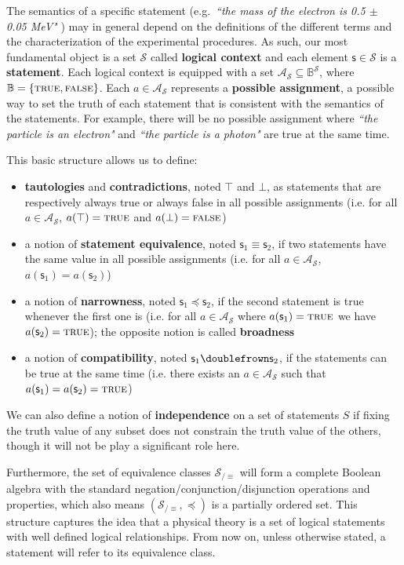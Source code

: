 \documentclass{article}
\def\Bool{\mathbb{B}}
\def\TRUE{\textsc{true}}
\def\FALSE{\textsc{false}}
\def\logCtx{\mathcal{S}}
\newcommand{\pAss}[1][\mathcal{S}] {\mathcal{A}_{#1}}
\def\tautology{\top} %
\def\contradiction{\bot} %
\newcommand{\stmt}[1][s] {\mathsf{#1}} %
\def\comp{\doublefrown} %
\def\narrower{\preccurlyeq} %
\newcommand{\statement}[1] {\emph{``#1"}}
\begin{document}
The semantics of a specific statement (e.g.~\statement{the mass of the electron is 0.5 $\pm$ 0.05 MeV} ) may in general depend on the definitions of the different terms and the characterization of the experimental procedures. As such, our most fundamental object is a set $\logCtx$ called \textbf{logical context} and each element $\stmt \in \logCtx$ is a \textbf{statement}. Each logical context is equipped with a set $\pAss \subseteq \Bool^\logCtx$, where $\Bool = \{ \TRUE, \FALSE \}$. Each $a \in \pAss$ represents a \textbf{possible assignment}, a possible way to set the truth of each statement that is consistent with the semantics of the statements. For example, there will be no possible assignment where \statement{the particle is an electron} and \statement{the particle is a photon} are true at the same time.

This basic structure allows us to define:
\begin{itemize}
	\item \textbf{tautologies} and \textbf{contradictions}, noted $\tautology$ and $\contradiction$, as statements that are respectively always true or always false in all possible assignments (i.e. for all $a \in \pAss$, $a(\tautology) = \TRUE$ and $a(\contradiction) = \FALSE$)
	\item a notion of \textbf{statement equivalence}, noted $\stmt_1 \equiv \stmt_2$, if two statements have the same value in all possible assignments (i.e. for all $a \in \pAss$, $a(\stmt_1) = a(\stmt_2)$)
	\item a notion of \textbf{narrowness}, noted $\stmt_1 \narrower \stmt_2$, if the second statement is true whenever the first one is (i.e. for all $a \in \pAss$ where $a(\stmt_1) = \TRUE$ we have $a(\stmt_2) = \TRUE$); the opposite notion is called \textbf{broadness} 
	\item a notion of \textbf{compatibility}, noted $\stmt_1 \comp \stmt_2$, if the statements can be true at the same time (i.e. there exists an $a \in \pAss$ such that $a(\stmt_1) = a(\stmt_2) = \TRUE$)
\end{itemize}
We can also define a notion of \textbf{independence} on a set of statements $S$ if fixing the truth value of any subset does not constrain the truth value of the others, though it will not be play a significant role here.

Furthermore, the set of equivalence classes $\logCtx_{/\equiv}$ will form a complete Boolean algebra with the standard negation/conjunction/disjunction operations and properties, which also means $(\logCtx_{/\equiv}, \narrower)$ is a partially ordered set. This structure captures the idea that a physical theory is a set of logical statements with well defined logical relationships. From now on, unless otherwise stated, a statement will refer to its equivalence class.
\end{document}
